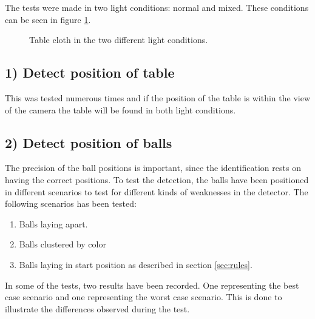 The tests were made in two light conditions: normal and mixed. These conditions can be seen in figure \ref{fig:difflightcon}.

\begin{figure}[H]
  \centering
  \quad           
   \caption{Table cloth in the two different light conditions.}
  \label{fig:difflightcon}
\end{figure}


\subsection{1) Detect position of table}

This was tested numerous times and if the position of the table is within the view of the camera the table will be found in both light conditions.\\

\subsection{2) Detect position of balls}
The precision of the ball positions is important, since the identification rests on having the correct positions. To test the detection, the balls have been positioned in different scenarios to test for different kinds of weaknesses in the detector. The following scenarios has been tested:
\begin{enumerate}
\setlength{\itemsep}{0mm}
	\item Balls laying apart.
	\item Balls clustered by color
	\item Balls laying in start position as described in section \ref{sec:rules}.
\end{enumerate}
In some of the tests, two results have been recorded. One representing the best case scenario and one representing the worst case scenario. This is done to illustrate the differences observed during the test.

